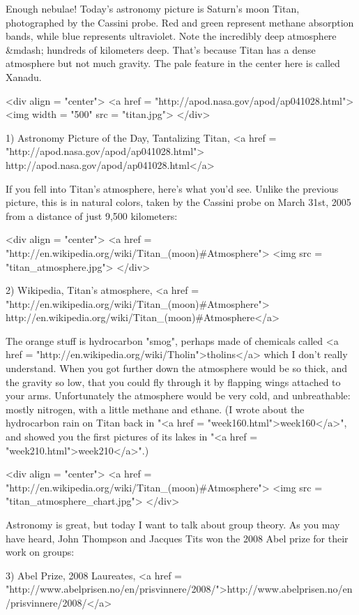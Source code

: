

Enough nebulae!  Today's astronomy picture is Saturn's moon Titan,
photographed by the Cassini probe.  Red and green represent methane
absorption bands, while blue represents ultraviolet.  Note the 
incredibly deep atmosphere &mdash; hundreds of kilometers deep.
That's because Titan has a dense atmosphere but not much gravity.
The pale feature in the center here is called Xanadu.  

<div align = "center">
<a href = "http://apod.nasa.gov/apod/ap041028.html">
<img width = "500" src = "titan.jpg">
</div>

1) Astronomy Picture of the Day, Tantalizing Titan, 
<a href = "http://apod.nasa.gov/apod/ap041028.html">
http://apod.nasa.gov/apod/ap041028.html</a>

If you fell into Titan's atmosphere, here's what you'd see.  
Unlike the previous picture, this is in natural colors, taken
by the Cassini probe on March 31st, 2005 from a distance of 
just 9,500 kilometers: 

<div align = "center">
<a href = "http://en.wikipedia.org/wiki/Titan_(moon)#Atmosphere">
<img src = "titan_atmosphere.jpg">
</div>

2) Wikipedia, Titan's atmosphere,
<a href = "http://en.wikipedia.org/wiki/Titan_(moon)#Atmosphere">
http://en.wikipedia.org/wiki/Titan_(moon)#Atmosphere</a>
 
The orange stuff is hydrocarbon "smog", perhaps made of
chemicals called <a href =
"http://en.wikipedia.org/wiki/Tholin">tholins</a> which I don't really
understand.  When you got further down the atmosphere would be so
thick, and the gravity so low, that you could fly through it by
flapping wings attached to your arms.  Unfortunately the atmosphere
would be very cold, and unbreathable: mostly nitrogen, with a little
methane and ethane.  (I wrote about the hydrocarbon rain on Titan back
in "<a href = "week160.html">week160</a>", and showed you
the first pictures of its lakes in "<a href =
"week210.html">week210</a>".)

<div align = "center">
<a href = "http://en.wikipedia.org/wiki/Titan_(moon)#Atmosphere">
<img src = "titan_atmosphere_chart.jpg">
</div>

Astronomy is great, but today I want to talk about group theory.
As you may have heard, John Thompson and Jacques Tits won the
2008 Abel prize for their work on groups:

3) Abel Prize, 2008 Laureates,
<a href = "http://www.abelprisen.no/en/prisvinnere/2008/">http://www.abelprisen.no/en/prisvinnere/2008/</a>

